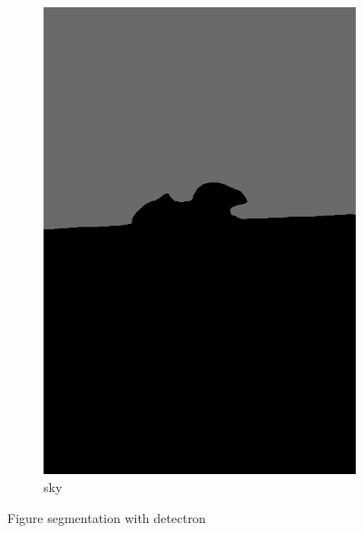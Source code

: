 \documentclass[11pt]{article}
\begin{document}
\begin{figure}[h]
\begin{subfigure}[b]{0.25\textwidth}
         \includegraphics[width=\textwidth]{sky-other-merged.png}
         \caption{sky}
         \label{fig:five over x}
     \end{subfigure}
        \caption{Figure segmentation with detectron}
        \label{fig:segmentation}
\end{figure}
\end{document}
